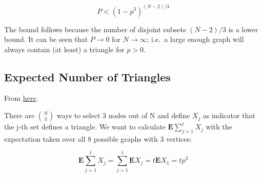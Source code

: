 \[
P < (1-p^3)^{(N-2)/3}
\]

The bound follows because the number of disjoint subsets \((N-2)/3\) is
a lower bound. It can be seen that \(P \rightarrow 0\) for
\(N \rightarrow \infty\); i.e.~a large enough graph will always contain
(at least) a triangle for \(p>0\).

\subsection{Expected Number of
Triangles}\label{expected-number-of-triangles}

From
\href{http://math.stackexchange.com/questions/730294/expected-number-of-triangles-in-a-random-graph-of-size-n?rq=1}{here}.

There are \({N \choose 3}\) ways to select 3 nodes out of N and define
\(X_j\) as indicator that the j-th set defines a triangle. We want to
calculate \(\mathbf{E} \sum_{j=1}^t X_j\) with the expectation taken
over all 8 possible graphs with 3 vertices:

\[
\mathbf{E} \sum_{j=1}^t X_j = \sum_{j=1}^t \mathbf{E} X_j = t \mathbf{E}X_1 = t p^3
\]
